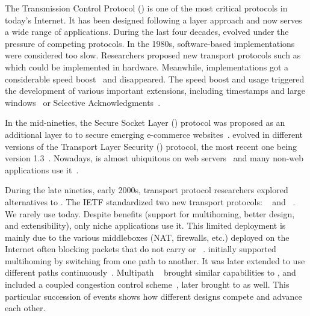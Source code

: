 The Transmission Control Protocol (\tcp) \cite{rfc793} is one of the most
critical protocols in today's Internet. It has been designed following a
layer approach and now serves a wide range of
applications. During the last four decades, \tcp evolved under
the pressure of competing protocols. In the 1980s, software-based \tcp
implementations were considered too slow. Researchers proposed new transport
protocols such as \xtp~\cite{sanders1990xpress} which could be implemented in
hardware. Meanwhile, \tcp implementations got a considerable speed
boost~\cite{clark1989analysis} and \xtp disappeared. The \tcp speed boost and
usage triggered the development of various important \tcp extensions, including
timestamps and large windows~\cite{rfc1323} or Selective
Acknowledgments~\cite{rfc2018}.

In the mid-nineties, the Secure Socket Layer (\ssl) protocol was proposed as an
additional layer to \tcp to secure emerging e-commerce
websites~\cite{draft-hickman-netscape-ssl}. \ssl evolved in different versions
of the Transport Layer Security (\tls) protocol, the most recent one being
version 1.3~\cite{rfc8446}. %
Nowadays, \tls is almost ubiquitous on web servers~\cite{holz2019era} and many
non-web applications use it~\cite{anderson2019tls}.

During the late nineties, early 2000s, transport protocol researchers explored
alternatives to \tcp. The IETF standardized two new transport protocols:
\dccp~\cite{kohler2006designing} and \sctp~\cite{rfc4960}. We rarely use \dccp
today. Despite \sctp benefits (support for multihoming, better design, and
extensibility), only niche applications use it. %
This limited deployment is mainly due to the various middleboxes (NAT,
firewalls, etc.) deployed on
the Internet often blocking packets that do not carry \tcp or
\udp~\cite{honda2011still}.  \sctp initially supported multihoming by switching
from one path to another. It was later extended to use different
paths continuously~\cite{iyengar2006concurrent}. Multipath
\tcp~\cite{rfc6824,raiciu2012hard} brought similar capabilities to \tcp, and
included a coupled congestion control scheme~\cite{wischik2011design}, later
brought to \sctp as well. This particular succession of events shows how
different designs compete and advance each other.

